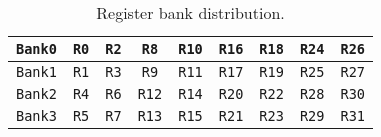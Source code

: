 \begin{table}[htbp]
\caption{Register bank distribution.}
\centering
\scalebox{0.9} {
\begin{tabular}{|c|c|c|c|c|c|c|c|c|}
\hline
    {\tt Bank0}&{\tt R0}&{\tt R2}&{\tt R8}&{\tt R10}&{\tt R16}&{\tt R18}&{\tt R24}&{\tt R26}\\
\hline
    {\tt Bank1}&{\tt R1}&{\tt R3}&{\tt R9}&{\tt R11}&{\tt R17}&{\tt R19}&{\tt R25}&{\tt R27} \\
\hline
    {\tt Bank2}&{\tt R4}&{\tt R6}&{\tt R12}&{\tt R14}&{\tt R20}&{\tt R22}&{\tt R28}&{\tt R30}\\
\hline
    {\tt Bank3}&{\tt R5}&{\tt R7}&{\tt R13}&{\tt R15}&{\tt R21}&{\tt R23}&{\tt R29}&{\tt R31}\\
\hline
\end{tabular}
}
\label{tab:reg}
\end{table}


